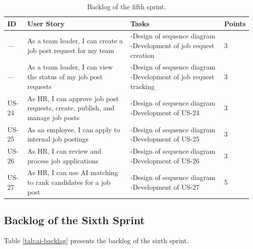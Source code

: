 \begin{longtable}[c]{
    |p{}
    |p{}|
    p{}|
    p{}| 
}
    \caption{Backlog of the fifth sprint.}
    \label{tab:recruitment-backlog}\\
    \hline
    ID & User Story & Tasks & Points \\
    \hline
    --- & As a team leader, I can create a job post request for my team
    & -Design of sequence diagram\newline
-Development of job request creation & 3 \\
    \hline
    --- & As a team leader, I can view the status of my job post requests
    & -Design of sequence diagram\newline
-Development of job request tracking & 3 \\
    \hline
    US-24 & As HR, I can approve job post requests, create, publish, and manage job posts
    & -Design of sequence diagram\newline
-Development of US-24 & 3 \\
    \hline
    US-25 & As an employee, I can apply to internal job postings
    & -Design of sequence diagram\newline
-Development of US-25 & 3 \\
    \hline
    US-26 & As HR, I can review and process job applications
    & -Design of sequence diagram\newline
-Development of US-26 & 3 \\
    \hline
    US-27 & As HR, I can use AI matching to rank candidates for a job post
    & -Design of sequence diagram\newline
-Development of US-27 & 5 \\
    \hline
\end{longtable}

\subsection{Backlog of the Sixth Sprint}
Table \ref{tab:ai-backlog} presents the backlog of the sixth sprint.

